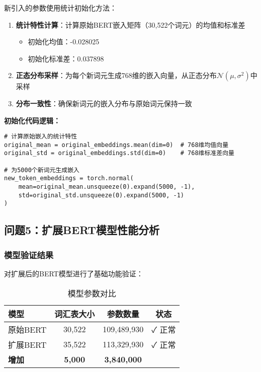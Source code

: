 \documentclass[12pt,letterpaper]{article}
\begin{document}
新引入的参数使用统计初始化方法：

\begin{enumerate}
    \item \textbf{统计特性计算}：计算原始BERT嵌入矩阵（30,522个词元）的均值和标准差
    \begin{itemize}
        \item 初始化均值：-0.028025
        \item 初始化标准差：0.037898
    \end{itemize}
    \item \textbf{正态分布采样}：为每个新词元生成768维的嵌入向量，从正态分布$\mathcal{N}(\mu, \sigma^2)$中采样
    \item \textbf{分布一致性}：确保新词元的嵌入分布与原始词元保持一致
\end{enumerate}

\textbf{初始化代码逻辑：}
\begin{verbatim}
# 计算原始嵌入的统计特性
original_mean = original_embeddings.mean(dim=0)  # 768维均值向量
original_std = original_embeddings.std(dim=0)    # 768维标准差向量

# 为5000个新词元生成嵌入
new_token_embeddings = torch.normal(
    mean=original_mean.unsqueeze(0).expand(5000, -1),
    std=original_std.unsqueeze(0).expand(5000, -1)
)
\end{verbatim}

\subsection{问题5：扩展BERT模型性能分析}

\subsubsection{模型验证结果}

对扩展后的BERT模型进行了基础功能验证：

\begin{table}[h]
\centering
\begin{tabular}{|l|c|c|c|}
\hline
\textbf{模型} & \textbf{词汇表大小} & \textbf{参数数量} & \textbf{状态} \\
\hline
原始BERT & 30,522 & 109,489,930 & ✓ 正常 \\
扩展BERT & 35,522 & 113,329,930 & ✓ 正常 \\
\hline
\textbf{增加} & \textbf{5,000} & \textbf{3,840,000} & \\
\hline
\end{tabular}
\caption{模型参数对比}
\end{table}
\end{document}
